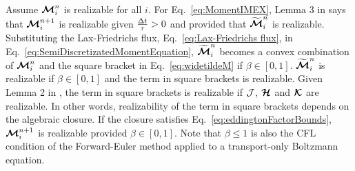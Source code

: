Assume $\boldsymbol{\mathcal{M}}_{i}^{n}$ is realizable for all $i$. 
For Eq.~\eqref{eq:MomentIMEX}, Lemma 3 in \cite{chu_etal_2018} says that $\boldsymbol{\mathcal{M}}^{n+1}_{i}$ is realizable given $\frac{\Delta t}{\tau} > 0$ and provided that $\widetilde{\boldsymbol{\mathcal{M}}}^{n}_{i}$ is realizable.
Substituting the Lax-Friedrichs flux, Eq.~\eqref{eq:Lax-Friedrichs flux}, in Eq.~\eqref{eq:SemiDiscretizatedMomentEquation}, $\widetilde{\boldsymbol{\mathcal{M}}}^{n}_{i}$ becomes a convex combination of $\boldsymbol{\mathcal{M}}_{i}^{n}$ and the square bracket in Eq.~\eqref{eq:widetildeM} if $\beta \in [0,1]$.
$\widetilde{\boldsymbol{\mathcal{M}}}^{n}_{i}$ is realizable if $\beta \in [0,1]$ and the term in square brackets is realizable.
Given Lemma 2 in \cite{chu_etal_2018}, the term in square brackets is realizable if $\mathcal{J}$, $\boldsymbol{\mathcal{H}}$ and $\boldsymbol{\mathcal{K}}$ are realizable.
In other words, realizability of the term in square brackets depends on the algebraic closure.
If the closure satisfies Eq.~\eqref{eq:eddingtonFactorBounds},
$\boldsymbol{\mathcal{M}}^{n+1}_{i}$ is realizable provided $\beta \in [0,1]$.
Note that $\beta \leq 1$ is also the CFL condition of the Forward-Euler method applied to a transport-only Boltzmann equation.
